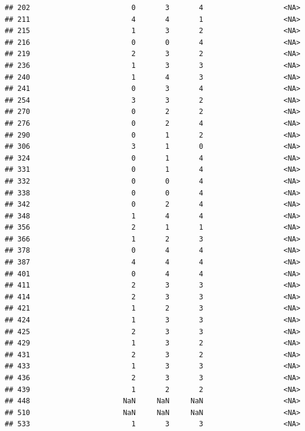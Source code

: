 \documentclass[
]{article}
\begin{document}
\begin{verbatim}
## 202                        0       3       4                   <NA>
## 211                        4       4       1                   <NA>
## 215                        1       3       2                   <NA>
## 216                        0       0       4                   <NA>
## 219                        2       3       2                   <NA>
## 236                        1       3       3                   <NA>
## 240                        1       4       3                   <NA>
## 241                        0       3       4                   <NA>
## 254                        3       3       2                   <NA>
## 270                        0       2       2                   <NA>
## 276                        0       2       4                   <NA>
## 290                        0       1       2                   <NA>
## 306                        3       1       0                   <NA>
## 324                        0       1       4                   <NA>
## 331                        0       1       4                   <NA>
## 332                        0       0       4                   <NA>
## 338                        0       0       4                   <NA>
## 342                        0       2       4                   <NA>
## 348                        1       4       4                   <NA>
## 356                        2       1       1                   <NA>
## 366                        1       2       3                   <NA>
## 378                        0       4       4                   <NA>
## 387                        4       4       4                   <NA>
## 401                        0       4       4                   <NA>
## 411                        2       3       3                   <NA>
## 414                        2       3       3                   <NA>
## 421                        1       2       3                   <NA>
## 424                        1       3       3                   <NA>
## 425                        2       3       3                   <NA>
## 429                        1       3       2                   <NA>
## 431                        2       3       2                   <NA>
## 433                        1       3       3                   <NA>
## 436                        2       3       3                   <NA>
## 439                        1       2       2                   <NA>
## 448                      NaN     NaN     NaN                   <NA>
## 510                      NaN     NaN     NaN                   <NA>
## 533                        1       3       3                   <NA>

\end{verbatim}
\end{document}
